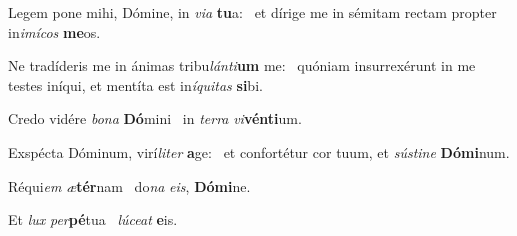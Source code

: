 \item Legem pone mihi, Dómine, in \textit{via} \textbf{tu}a:~\psstar{} et dírige me in sémitam rectam propter in\textit{imícos} \textbf{me}os.
\item Ne tradíderis me in ánimas tribu\textit{lánti}\textbf{um} me:~\psstar{} quóniam insurrexérunt in me testes iníqui, et mentíta est in\textit{íquitas} \textbf{si}bi.
\item Credo vidére \textit{bona} \textbf{Dó}mini~\psstar{} in \textit{terra} \textit{vi}\textbf{vén}\textbf{ti}um.
\item Exspécta Dóminum, virí\textit{liter} \textbf{a}ge:~\psstar{} et confortétur cor tuum, et \textit{sústine} \textbf{Dó}\textbf{mi}num.
\item Réqui\textit{em} \textit{æ}\textbf{tér}nam~\psstar{} do\textit{na} \textit{eis}, \textbf{Dó}\textbf{mi}ne.
\item Et \textit{lux} \textit{per}\textbf{pé}tua~\psstar{} \textit{lúceat} \textbf{e}is.